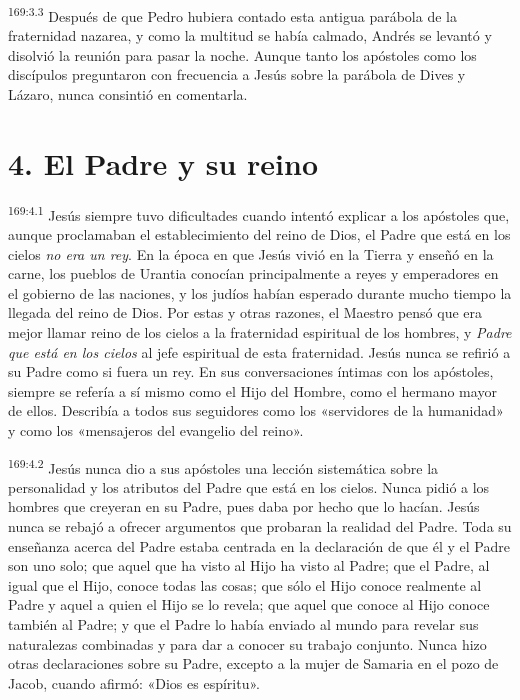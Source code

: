 \par 
\textsuperscript{169:3.3} Después de que Pedro hubiera contado esta antigua parábola de la fraternidad nazarea, y como la multitud se había calmado, Andrés se levantó y disolvió la reunión para pasar la noche. Aunque tanto los apóstoles como los discípulos preguntaron con frecuencia a Jesús sobre la parábola de Dives y Lázaro, nunca consintió en comentarla.

\section*{4. El Padre y su reino}
\par 
\textsuperscript{169:4.1} Jesús siempre tuvo dificultades cuando intentó explicar a los apóstoles que, aunque proclamaban el establecimiento del reino de Dios, el Padre que está en los cielos \textit{no era un rey}. En la época en que Jesús vivió en la Tierra y enseñó en la carne, los pueblos de Urantia conocían principalmente a reyes y emperadores en el gobierno de las naciones, y los judíos habían esperado durante mucho tiempo la llegada del reino de Dios. Por estas y otras razones, el Maestro pensó que era mejor llamar reino de los cielos a la fraternidad espiritual de los hombres, y \textit{Padre que está en los cielos} al jefe espiritual de esta fraternidad. Jesús nunca se refirió a su Padre como si fuera un rey. En sus conversaciones íntimas con los apóstoles, siempre se refería a sí mismo como el Hijo del Hombre, como el hermano mayor de ellos. Describía a todos sus seguidores como los «servidores de la humanidad» y como los «mensajeros del evangelio del reino».

\par 
\textsuperscript{169:4.2} Jesús nunca dio a sus apóstoles una lección sistemática sobre la personalidad y los atributos del Padre que está en los cielos. Nunca pidió a los hombres que creyeran en su Padre, pues daba por hecho que lo hacían. Jesús nunca se rebajó a ofrecer argumentos que probaran la realidad del Padre. Toda su enseñanza acerca del Padre estaba centrada en la declaración de que él y el Padre son uno solo; que aquel que ha visto al Hijo ha visto al Padre; que el Padre, al igual que el Hijo, conoce todas las cosas; que sólo el Hijo conoce realmente al Padre y aquel a quien el Hijo se lo revela; que aquel que conoce al Hijo conoce también al Padre; y que el Padre lo había enviado al mundo para revelar sus naturalezas combinadas y para dar a conocer su trabajo conjunto. Nunca hizo otras declaraciones sobre su Padre, excepto a la mujer de Samaria en el pozo de Jacob, cuando afirmó: «Dios es espíritu».

